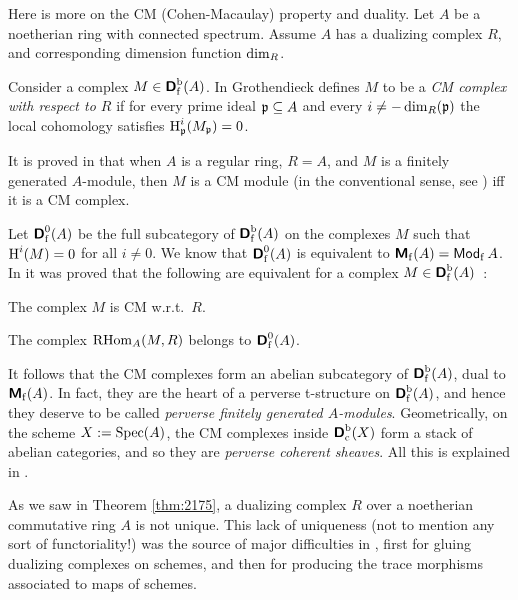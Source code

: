 \begin{rem} \label{rem:2270}
Here is more on the CM (Cohen-Macaulay) property and duality. 
Let $A$ be a noetherian ring with connected spectrum. Assume $A$ has a 
dualizing complex $R$, and corresponding dimension function $\operatorname{dim}_{R}$. 

Consider a complex $M \in  \boldsymbol{\mathsf{D}}_{\mathrm{f}}^{\mathrm{b}}(A)$.
In \cite{RD} Grothendieck defines $M$ to be a {\em CM complex with respect to 
$R$} if for every prime ideal $\mathfrak{p} \subseteq A$ and every 
$i \neq - \operatorname{dim}_{R}(\mathfrak{p})$ the local cohomology satisfies 
$\operatorname{H}^i_{\mathfrak{p}}(M_{\mathfrak{p}}) = 0$.

It is proved in \cite{RD} that when $A$ is a regular ring, 
$R = A$, and $M$ is a finitely generated $A$-module, then $M$ is a CM module 
(in the conventional sense, see \cite{Mats}) iff it is a CM complex. 

Let $\boldsymbol{\mathsf{D}}_{\mathrm{f}}^{0}(A)$ be the full subcategory of 
$\boldsymbol{\mathsf{D}}_{\mathrm{f}}^{\mathrm{b}}(A)$ on the complexes $M$ such that 
$\operatorname{H}^i(M) = 0$ for all $i \neq 0$.
We know that $\boldsymbol{\mathsf{D}}_{\mathrm{f}}^{0}(A)$
is equivalent to 
$\boldsymbol{\mathsf{M}}_{\mathrm{f}}(A) = \operatorname{\mathsf{Mod}}_{\mathrm{f}} A$.
In \cite{YeZh2} it was proved that the following
are equivalent for a complex $M \in  \boldsymbol{\mathsf{D}}_{\mathrm{f}}^{\mathrm{b}}(A)$~:
\begin{enumerate}
 The complex $M$ is CM w.r.t.\ $R$. 

 The complex $\operatorname{RHom}_A(M, R)$ belongs to 
$\boldsymbol{\mathsf{D}}_{\mathrm{f}}^{0}(A)$. 
\end{enumerate}

It follows that the CM complexes form an abelian subcategory of 
$\boldsymbol{\mathsf{D}}^{\mathrm{b}}_{\mathrm{f}}(A)$,
dual to $\boldsymbol{\mathsf{M}}_{\mathrm{f}}(A)$. 
In fact, they are the heart of a perverse t-structure on 
$\boldsymbol{\mathsf{D}}^{\mathrm{b}}_{\mathrm{f}}(A)$,
and hence they deserve to be called {\em perverse finitely generated 
$A$-modules}. Geometrically, on the scheme $X := \operatorname{Spec}(A)$, 
the CM complexes inside $\boldsymbol{\mathsf{D}}^{\mathrm{b}}_{\mathrm{c}}(X)$
form a stack of abelian categories, and so they are 
{\em perverse coherent sheaves}. All this is explained in 
\cite[Section 6]{YeZh2}.
\end{rem}



\label{subsec:squaring}

As we saw in Theorem \ref{thm:2175}, a dualizing complex $R$ 
over a noetherian commutative ring $A$ is not unique. This lack of uniqueness 
(not to mention any sort of functoriality!) was the source of major 
difficulties 
in \cite{RD}, first for gluing dualizing complexes on schemes, and then for 
producing the trace morphisms associated to maps of schemes. 

